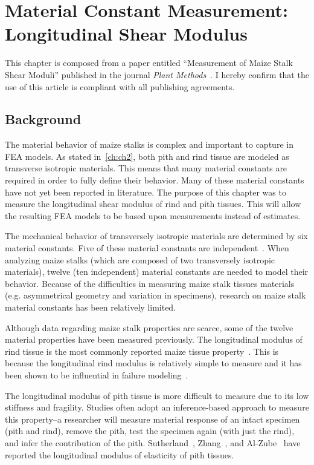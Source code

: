 \chapter{Material Constant Measurement: Longitudinal Shear Modulus}
\label{ch:ch3}
\noindent This chapter is composed from a paper entitled ``Measurement of Maize Stalk Shear Moduli'' published in the journal {\itshape Plant Methods}~. I hereby confirm that the use of this article is compliant with all publishing agreements.

\section{Background}
\label{sec:ch3_background}
The material behavior of maize stalks is complex and important to capture in FEA models. As stated in~\cref{ch:ch2}, both pith and rind tissue are modeled as transverse isotropic materials. This means that many material constants are required in order to fully define their behavior. Many of these material constants have not yet been reported in literature. The purpose of this chapter was to measure the longitudinal shear modulus of rind and pith tissues. This will allow the resulting FEA models to be based upon measurements instead of estimates.

The mechanical behavior of transversely isotropic materials are determined by six material constants. Five of these material constants are independent~. When analyzing maize stalks (which are composed of two transversely isotropic materials), twelve (ten independent) material constants are needed to model their behavior. Because of the difficulties in measuring maize stalk tissues materials (e.g. asymmetrical geometry and variation in specimens), research on maize stalk material constants has been relatively limited.

Although data regarding maize stalk properties are scarce, some of the twelve material properties have been measured previously. The longitudinal modulus of rind tissue is the most commonly reported maize tissue property~. This is because the longitudinal rind modulus is relatively simple to measure and it has been shown to be influential in failure modeling~. 

The longitudinal modulus of pith tissue is more difficult to measure due to its low stiffness and fragility. Studies often adopt an inference-based approach to measure this property–a researcher will measure material response of an intact specimen (pith and rind), remove the pith, test the specimen again (with just the rind), and infer the contribution of the pith. Sutherland~, Zhang~, and Al-Zube~ have reported the longitudinal modulus of elasticity of pith tissues.

